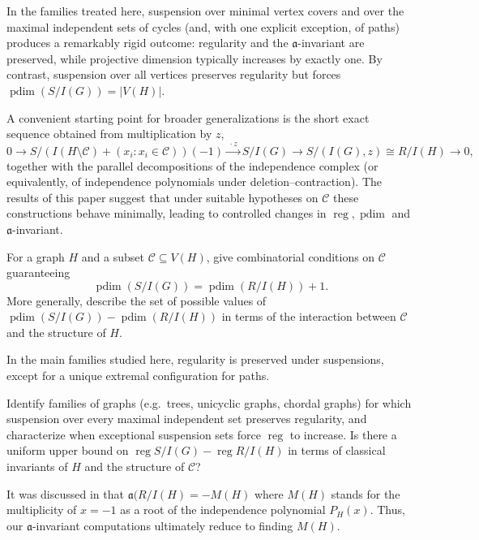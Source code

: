 \documentclass[12pt]{amsart}
\theoremstyle{plain}
\theoremstyle{definition}
\DeclareMathOperator{\reg}{reg}
\DeclareMathOperator{\pdim}{pdim}
\begin{document}
In the
families treated here, suspension over minimal vertex covers and over the maximal independent sets of
cycles (and, with one explicit exception, of paths) produces a remarkably rigid outcome:
regularity and the $\mathfrak a$-invariant are preserved, while projective dimension typically increases by
exactly one.  By contrast, suspension over all vertices preserves regularity but forces
$\pdim (S/I(G))=|V(H)|$. 



A convenient starting point for broader generalizations is the short exact sequence obtained from
multiplication by $z$,
\[
0\longrightarrow S/(I(H\setminus \mathcal{C})+(x_i: x_i\in\mathcal C))(-1)\xrightarrow{\ \cdot z\ } S/I(G)
\longrightarrow S/(I(G),z)\cong R/I(H)\longrightarrow 0,
\]
together with the parallel decompositions of the independence complex (or equivalently, of
independence polynomials under deletion--contraction).  The results of this paper suggest that
under suitable hypotheses on $\mathcal C$ these constructions behave minimally, leading to controlled changes in $\reg, \pdim$ and $\mathfrak a$-invariant.

\begin{question}
For a graph $H$ and a subset $\mathcal C\subseteq V(H)$, give combinatorial conditions on $\mathcal C$
guaranteeing
\[
\pdim (S/I(G))=\pdim (R/I(H))+1.
\]
More generally, describe the set of possible values of
$\pdim (S/I(G))-\pdim (R/I(H))$ in terms of the interaction between $\mathcal C$ and the
 structure of $H$.
\end{question}

In the main families studied here, regularity is preserved under suspensions, except for a unique
extremal configuration for paths. 

\begin{question}
 Identify families of graphs  (e.g.\ trees, unicyclic graphs,
chordal graphs) for which suspension over every maximal independent set preserves regularity, and
characterize when exceptional suspension sets force $\reg$ to increase.  Is there a uniform upper bound
on $\reg S/I(G)-\reg R/I(H)$ in terms of classical invariants of $H$ and the structure of $\mathcal C$?
\end{question}


It was discussed in \cite{biermann2026realizableregdeghpairs} that $\mathfrak{a}(R/I(H)=-M(H)$ where $M(H)$ stands for the multiplicity of $x=-1$ as a root of the independence polynomial $P_H(x)$. Thus, our $\mathfrak a$-invariant computations ultimately reduce to finding $M(H)$. 
\end{document}
